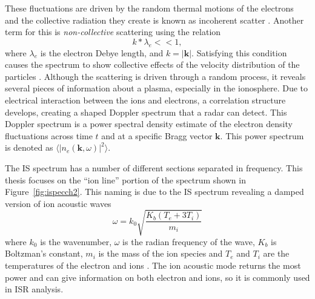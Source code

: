 These fluctuations are driven by the random thermal motions of the electrons and the collective radiation they create is known as incoherent scatter \citep{kudeki:milla:1}. Another term for this is \textit{non-collective} scattering using the relation
\begin{equation}
\label{eqn:incohorig}
k*\lambda_{e} << 1,
\end{equation}
where $\lambda_{e}$ is the electron Debye length, and $k=|\mathbf{k}|$. Satisfying this condition causes the spectrum to show collective effects of the velocity distribution of the particles \citep{sheffield2010}.
Although the scattering is driven through a random process, it reveals several pieces of information about a plasma, especially in the ionosphere. Due to electrical interaction between the ions and electrons, a correlation structure develops, creating a shaped Doppler spectrum that a radar can detect. This Doppler spectrum is a power spectral density estimate of the electron density fluctuations across time $t$  and at a specific Bragg vector $\mathbf{k}$. This power spectrum is denoted as $\langle \left|n_e(\mathbf{k},\omega)\right|^2\rangle$.

The IS spectrum has a number of different sections separated in frequency.
This thesis focuses on the ``ion line'' portion of the spectrum shown in Figure~\ref{fig:ispecch2}. This naming is due to the IS spectrum revealing a damped version of ion acoustic waves
\begin{equation} 
\label{eqn:ial}
\omega=k_0\sqrt{\frac{K_b(T_e+3T_i)}{m_i}}
\end{equation}
where $k_0$ is the wavenumber, $\omega$ is the radian frequency of the wave, $K_b$ is Boltzman's constant, $m_i$ is the mass of the ion species and $T_e$ and $T_i$ are the temperatures of the electron and ions \citep{chen1984introduction}. 
The ion acoustic mode returns the most power and can give information on both electron and ions, so it is commonly used in ISR analysis.

